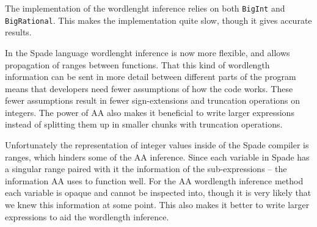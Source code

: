 The implementation of the wordlenght inference relies on both \verb+BigInt+ and \verb+BigRational+. This makes the implementation quite slow, though it gives accurate results.

In the Spade language wordlenght inference is now more flexible, and allows propagation of ranges between functions. That this kind of wordlength information can be sent in more detail between different parts of the program means that developers need fewer assumptions of how the code works. These fewer assumptions result in fewer sign-extensions and truncation operations on integers. The power of AA also makes it beneficial to write larger expressions instead of splitting them up in smaller chunks with truncation operations.

Unfortunately the representation of integer values inside of the Spade compiler is ranges, which hinders some of the AA inference. Since each variable in Spade has a singular range paired with it the information of the sub-expressions -- the information AA uses to function well. For the AA wordlength inference method each variable is opaque and cannot be inspected into, though it is very likely that we knew this information at some point. This also makes it better to write larger expressions to aid the wordlength inference.


